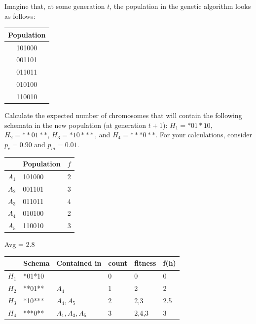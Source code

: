 \documentclass{article}
\begin{document}
Imagine that, at some generation $t$, the population in the genetic algorithm looks as follows:

\begin{table}[h]
    \centering
    \begin{tabular}{c}
        \hline
        Population  \\
        \hline
        101000\\
        001101\\
        011011\\
        010100\\
        110010\\
        \hline
    \end{tabular}
\end{table}

Calculate the expected number of chromosomes that will contain the following schemata in the new population (at generation $t + 1$): $H_1 = *01*10$, $H_2 = **01**$, $H_3 = *10***$, and $H_4 = ***0**$. For your
calculations, consider $p_c = 0.90$ and $p_m = 0.01$.

\pagebreak

\begin{table}[h]
    \centering
    \begin{tabular}{l|l|l}
        & Population & $f$ \\
        \hline
        $A_1$ & 101000  & 2 \\
        $A_2$ & 001101  & 3 \\
        $A_3$ & 011011  & 4 \\
        $A_4$ & 010100  & 2 \\
        $A_5$ & 110010  & 3 \\
    \end{tabular}
\end{table}
Avg = 2.8
\begin{table}[h]
    \centering
    \begin{tabular}{l|l|l|l|l|l}
        & Schema & Contained in &count & fitness & f(h) \\
        \hline
        $H_1$& *01*10 &  & 0 & 0 & 0 \\
        $H_2$& **01** & $A_4$ & 1 & 2 & 2\\
        $H_3$& *10*** & $A_4, A_5$ & 2 & 2,3 & 2.5\\
        $H_4$& ***0** & $A_1, A_3, A_5$ &3 & 2,4,3 & 3\\
    \end{tabular}
\end{table}
\end{document}

